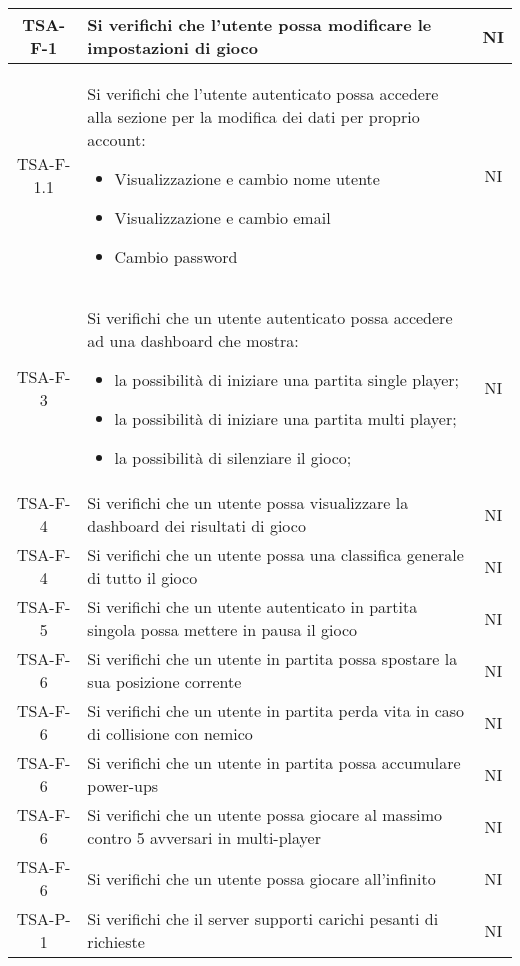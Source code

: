 \begin{center}
\begin{longtable}{|c|p{10cm}|c|}
			 TSA-F-1 & Si verifichi che l'utente possa modificare le impostazioni di gioco & NI \\
			 \hline
			 TSA-F-1.1 & Si verifichi che l'utente autenticato possa accedere alla sezione per la modifica dei dati per proprio account:
			 \begin{itemize}
			 	\item Visualizzazione e cambio nome utente
			 	\item Visualizzazione e cambio email
			 	\item Cambio password
			 \end{itemize}
			 & NI \\
			 \hline
			 TSA-F-3 & Si verifichi che un utente autenticato possa accedere ad una dashboard che mostra:
			 \begin{itemize}
			 	\item la possibilità di iniziare una partita single player;
			 	\item la possibilità di iniziare una partita multi player;
			 	\item la possibilità di silenziare il gioco;
			 \end{itemize} & NI \\
			 \hline
			 TSA-F-4 & Si verifichi che un utente possa visualizzare la dashboard dei risultati di gioco  & NI \\
			 \hline
			 TSA-F-4 & Si verifichi che un utente possa una classifica generale di tutto il gioco  & NI \\
			 \hline
			 TSA-F-5 & Si verifichi che un utente autenticato in partita singola possa mettere in pausa il gioco & NI \\
			 \hline
			 TSA-F-6 & Si verifichi che un utente in partita possa spostare la sua posizione corrente & NI \\
			 \hline
			 TSA-F-6 & Si verifichi che un utente in partita perda vita in caso di collisione con nemico & NI \\
			 \hline
			 TSA-F-6 & Si verifichi che un utente in partita possa accumulare power-ups & NI \\
			 \hline
			 TSA-F-6 & Si verifichi che un utente possa giocare al massimo contro 5 avversari in multi-player & NI \\
			 \hline
			 TSA-F-6 & Si verifichi che un utente possa giocare all'infinito & NI \\
			 \hline
			 TSA-P-1 & Si verifichi che il server supporti carichi pesanti di richieste & NI \\ 

\end{longtable}
\end{center}
